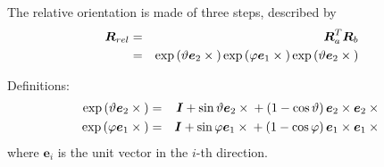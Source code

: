 \documentclass[10pt,dvips]{report}
\newcommand{\T}[1]{\boldsymbol{#1}}
\begin{document}
The relative orientation is made of three steps, described by
\begin{eqnarray*}
	\T{R}_{rel}
	& = & \T{R}_a^T \T{R}_b \\
	& = & \llk{exp}\plbr{\vartheta \T{e}_2 \times{}}
		\llk{exp}\plbr{\varphi \T{e}_1 \times{}}
		\llk{exp}\plbr{\vartheta \T{e}_2 \times{}}
\end{eqnarray*}

\noindent
Definitions:
\begin{eqnarray}
	\llk{exp}\plbr{\vartheta \T{e}_2 \times{}} & = &
		\T{I} + \sin\vartheta \T{e}_2\times{}
			+ \plbr{1 - \cos\vartheta}\T{e}_2\times\T{e}_2\times{}
		\label{eq:GIMBAL-EXP-THETA} \\
	\llk{exp}\plbr{\varphi \T{e}_1 \times{}} & = &
		\T{I} + \sin\varphi \T{e}_1\times{}
			+ \plbr{1 - \cos\varphi}\T{e}_1\times\T{e}_1\times{}
		\label{eq:GIMBAL-EXP-PHI}
\end{eqnarray}
where $\T{e}_i$ is the unit vector in the $i$-th direction.
\end{document}
